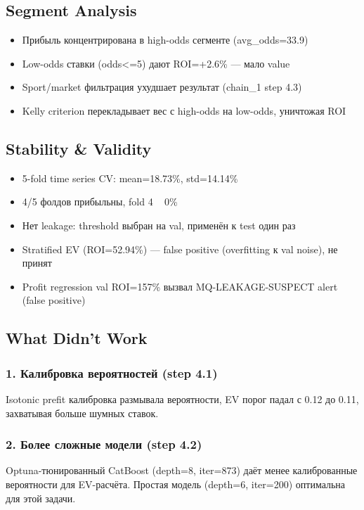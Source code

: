 \documentclass[12pt,a4paper]{article}
\begin{document}
\subsection{Segment Analysis}
\begin{itemize}
  \item Прибыль концентрирована в high-odds сегменте (avg\_odds=33.9)
  \item Low-odds ставки (odds<=5) дают ROI=+2.6\% — мало value
  \item Sport/market фильтрация ухудшает результат (chain\_1 step 4.3)
  \item Kelly criterion перекладывает вес с high-odds на low-odds, уничтожая ROI
\end{itemize}

\subsection{Stability \& Validity}
\begin{itemize}
  \item 5-fold time series CV: mean=18.73\%, std=14.14\%
  \item 4/5 фолдов прибыльны, fold 4 ~ 0\%
  \item Нет leakage: threshold выбран на val, применён к test один раз
  \item Stratified EV (ROI=52.94\%) — false positive (overfitting к val noise), не принят
  \item Profit regression val ROI=157\% вызвал MQ-LEAKAGE-SUSPECT alert (false positive)
\end{itemize}

\subsection{What Didn't Work}

\subsubsection{1. Калибровка вероятностей (step 4.1)}
Isotonic prefit калибровка размывала вероятности, EV порог падал с 0.12 до 0.11, захватывая больше шумных ставок.

\subsubsection{2. Более сложные модели (step 4.2)}
Optuna-тюнированный CatBoost (depth=8, iter=873) даёт менее калиброванные вероятности для EV-расчёта. Простая модель (depth=6, iter=200) оптимальна для этой задачи.
\end{document}
